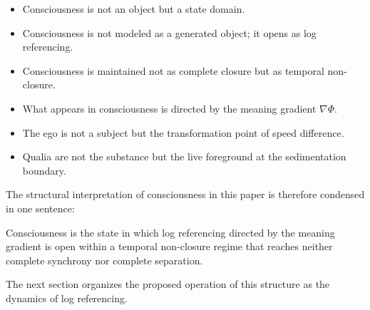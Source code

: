 \begin{itemize}
\item Consciousness is not an object but a state domain.
\item Consciousness is not modeled as a generated object; it opens as log referencing.
\item Consciousness is maintained not as complete closure but as temporal non-closure.
\item What appears in consciousness is directed by the meaning gradient $\nabla\Phi$.
\item The ego is not a subject but the transformation point of speed difference.
\item Qualia are not the substance but the live foreground at the sedimentation boundary.
\end{itemize}

The structural interpretation of consciousness in this paper is therefore condensed in one sentence:

Consciousness is the state in which log referencing directed by the meaning gradient is open within a temporal non-closure regime that reaches neither complete synchrony nor complete separation.

The next section organizes the proposed operation of this structure as the dynamics of log referencing.
